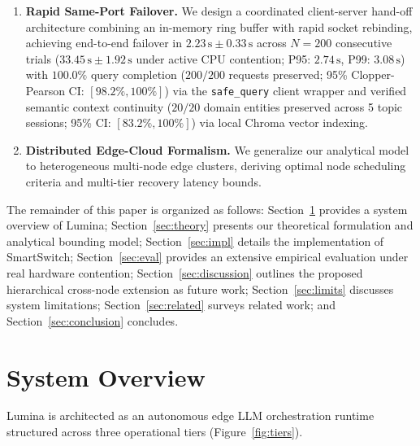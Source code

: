 \documentclass[11pt,a4paper]{article}
\newcommand{\su}{\,\mathrm{s}}
\newcommand{\code}[1]{\texttt{#1}}
\begin{document}
\begin{enumerate}[leftmargin=*]
\item \textbf{Rapid Same-Port Failover.} We design a coordinated client-server hand-off architecture combining an in-memory ring buffer with rapid socket rebinding, achieving end-to-end failover in \textbf{$2.23\su \pm 0.33\su$} across $N=200$ consecutive trials ($33.45\su \pm 1.92\su$ under active CPU contention; P95: $2.74\su$, P99: $3.08\su$) with $100.0\%$ query completion ($200/200$ requests preserved; 95\% Clopper-Pearson CI: $[98.2\%, 100\%]$) via the \code{safe\_query} client wrapper and verified semantic context continuity ($20/20$ domain entities preserved across 5 topic sessions; 95\% CI: $[83.2\%, 100\%]$) via local Chroma vector indexing.
\item \textbf{Distributed Edge-Cloud Formalism.} We generalize our analytical model to heterogeneous multi-node edge clusters, deriving optimal node scheduling criteria and multi-tier recovery latency bounds.
\end{enumerate}

The remainder of this paper is organized as follows: Section~\ref{sec:overview} provides a system overview of Lumina; Section~\ref{sec:theory} presents our theoretical formulation and analytical bounding model; Section~\ref{sec:impl} details the implementation of SmartSwitch; Section~\ref{sec:eval} provides an extensive empirical evaluation under real hardware contention; Section~\ref{sec:discussion} outlines the proposed hierarchical cross-node extension as future work; Section~\ref{sec:limits} discusses system limitations; Section~\ref{sec:related} surveys related work; and Section~\ref{sec:conclusion} concludes.

\section{System Overview}\label{sec:overview}
Lumina is architected as an autonomous edge LLM orchestration runtime structured across three operational tiers (Figure~\ref{fig:tiers}).
\end{document}
